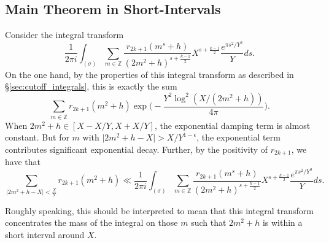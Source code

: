 \subsection{Main Theorem in Short-Intervals}


Consider the integral transform
\begin{equation}
  \frac{1}{2\pi i} \int_{(\sigma)} \sum_{m \in \mathbb{Z}} \frac{r_{2k+1}{(m^s +
  h)}}{(2m^2 + h)^{s + \frac{k-1}{2}}} X^{s + \frac{k-1}{2}} \frac{e^{\pi s^2/Y^2}}{Y} ds.
\end{equation}
On the one hand, by the properties of this integral transform as described in
\S\ref{sec:cutoff_integrals}, this is exactly the sum
\begin{equation}
  \sum_{m \in \mathbb{Z}} r_{2k+1}(m^2 + h) \exp\bigg( -\frac{Y^2
  \log^2(X/(2m^2+h))}{4\pi} \bigg).
\end{equation}
When $2m^2 + h \in [X - X/Y, X + X/Y]$, the exponential damping term is almost constant.
But for $m$ with $\lvert 2m^2 + h - X \rvert > X/Y^{1-\epsilon}$, the exponential term
contributes significant exponential decay.
Further, by the positivity of $r_{2k+1}$, we have that
\begin{equation}
  \sum_{\lvert 2m^2 + h - X \rvert < \frac{X}{Y}} r_{2k+1}(m^2 + h) \ll \frac{1}{2\pi i}
  \int_{(\sigma)} \sum_{m \in \mathbb{Z}} \frac{r_{2k+1}{(m^s + h)}}{(2m^2 + h)^{s +
  \frac{k-1}{2}}} X^{s + \frac{k-1}{2}} \frac{e^{\pi s^2/Y^2}}{Y} ds.
\end{equation}


\begin{remark}
  Roughly speaking, this should be interpreted to mean that this integral transform
  concentrates the mass of the integral on those $m$ such that $2m^2 + h$ is within a
  short interval around $X$.
\end{remark}


